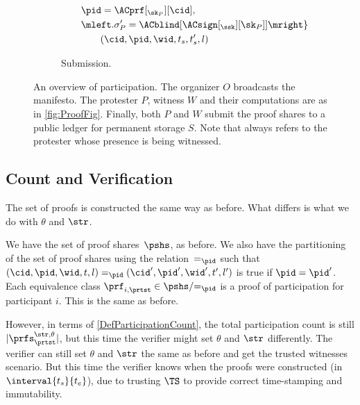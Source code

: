 \begin{figure*}
\begin{subfigure}{\columnwidth}
\begin{align*}
        & \qquad \pid = \ACprf[_{\sk_P}][\cid], \\
        & \qquad \mleft. \sigma_P' = \ACblind[\ACsign[_{\ssk}][\sk_P]] \mright\} 
        \\
        & \qquad\qquad (\cid, \pid, \wid, t_s, t_s', l)
    \end{align*}
    \caption{Submission.}
  \end{subfigure}
  \caption{%
    An overview of \CROCUS participation.\@
    The organizer \(O\) broadcasts the manifesto.
    The protester \(P\), witness \(W\) and their computations are as in \cref{fig:ProofFig}.
    Finally, both \(P\) and \(W\) submit the proof shares to a
   public ledger for permanent storage \(S\). Note that \pid  always refers to the
    protester whose presence is being witnessed.
  }%
  \label{fig:ProtocolOverview}
\end{figure*}


\subsection{Count and Verification}%
\label{ProtocolVerification}

The set of proofs is constructed the same way as before.
What differs is what we do with \(\theta\) and \(\str\).

We have the set of proof shares~\(\pshs\), as before.
We also have the partitioning of the set of proof shares using the 
relation~\(=_\pid\) such that \(
  (\cid, \pid, \wid, t, l) =_\pid (\cid', \pid', \wid', t', l')
\) is true if \(\pid = \pid'\).
Each equivalence class \(\prf_{i, \prtst} \in \pshs/{=_\pid}\) is a proof of 
participation for participant \(i\).
This is the same as before.

However, in terms of \cref{DefParticipationCount}, the total participation 
count is still \(|\prfs_\prtst^{\str, \theta}|\), but this time the verifier 
might set \(\theta\) and \(\str\) differently.
The verifier can still set \(\theta\) and \(\str\) the same as before and get 
the trusted witnesses scenario.
But this time the verifier knows when the proofs were constructed (in 
\(\interval{t_s}{t_e}\)), due to trusting \(\TS\) to provide correct 
time-stamping and immutability.

